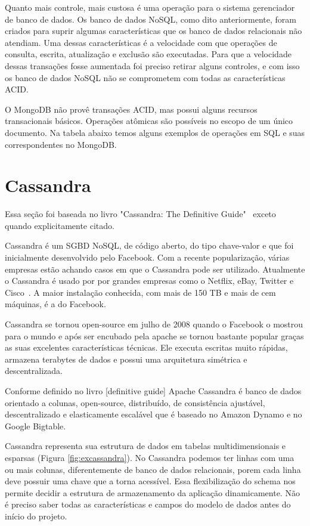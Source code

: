 Quanto mais controle, mais custosa é uma operação para o sistema gerenciador de banco de dados.  Os banco de dados NoSQL, como dito anteriormente, foram criados para suprir algumas características que os banco de dados relacionais não atendiam. Uma dessas características é a velocidade com que operações de consulta, escrita, atualização e exclusão são executadas.  Para que a velocidade dessas transações fosse aumentada foi preciso retirar alguns controles, e com isso os banco de dados NoSQL não se comprometem com todas as características ACID.

O MongoDB não provê transações ACID, mas possui alguns recursos transacionais básicos. Operações atômicas são possíveis no escopo de um único documento. Na tabela abaixo temos alguns exemplos de operações em SQL e suas correspondentes no MongoDB.


\section{Cassandra}

Essa seção foi baseada no livro "Cassandra: The Definitive Guide"~\cite{cassandraguide} exceto quando explicitamente citado.

Cassandra é um SGBD NoSQL, de código aberto, do tipo chave-valor e que foi inicialmente desenvolvido pelo Facebook. Com a recente popularização, várias empresas estão achando casos em que o Cassandra pode ser utilizado. Atualmente o Cassandra é usado por por grandes empresas como o Netflix, eBay, Twitter e Cisco~\cite{sitecassandra}. A maior instalação conhecida, com mais de 150 TB e mais de cem máquinas, é a do Facebook.

Cassandra se tornou open-source em julho de 2008 quando o Facebook o mostrou para o mundo e após ser encubado pela apache se tornou bastante popular graças as suas excelentes características técnicas. Ele executa escritas muito rápidas, armazena terabytes de dados e possui uma arquitetura simétrica e descentralizada.

Conforme definido no livro [definitive guide] Apache Cassandra é banco de dados orientado a colunas, open-source, distribuído, de consistência ajustável, descentralizado e elasticamente escalável que é baseado no Amazon Dynamo e no Google Bigtable.

Cassandra representa sua estrutura de dados em tabelas multidimensionais e esparsas (Figura \ref{fig:excassandra}).  No Cassandra podemos ter linhas com uma ou mais colunas, diferentemente de banco de dados relacionais, porem cada linha deve possuir uma chave que a torna acessível. Essa flexibilização do schema nos permite decidir a estrutura de armazenamento da aplicação dinamicamente. Não é preciso saber todas as características e campos do modelo de dados antes do início do projeto.

